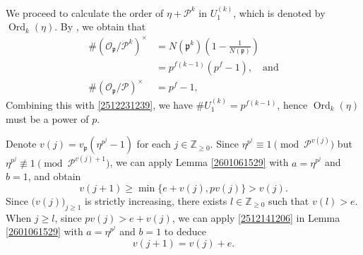 \documentclass[12pt]{amsart}
\theoremstyle{plain}
\theoremstyle{definition}
\theoremstyle{remark}
\numberwithin{equation}{section}
\newcommand{\Z}{\mathbb Z}
\begin{document}
	We proceed to calculate the order of \(\eta + \mathcal{ P}^k\) in $U_1^{(k)}$, which is denoted by \(\operatorname{Ord}_k(\eta)\). By \cite[Theorem 80]{Hecke}, we obtain that  
	\[
	\begin{split}
		\#(\mathcal{O}_\mathfrak{p} / \mathcal{P}^k)^{\times}&= N(\mathfrak p^k)\left(1 - \frac{1}{N( \mathfrak{p})}\right)\\
		&= p^{f(k-1)}(p^f - 1),\quad \text{and}\\
		\#(\mathcal{O}_\mathfrak{p} / \mathcal{P})^{\times} &= p^f - 1,
	\end{split}
	\] 
	Combining this with \eqref{2512231239}, we have $\#U_1^{(k)} = p^{f(k-1)}$, hence \(\operatorname{Ord}_k(\eta)\) must be a power of \(p\). 
	
	Denote $v(j)=v_\mathfrak{p}(\eta^{p^j}-1)$ for each  $j\in\Z_{\ge0}$. Since $\eta^{p^{j}}\equiv 1\!\!\pmod{\mathcal{P}^{v(j)}}$ but $\eta^{p^{j}}\not\equiv 1\!\!\pmod{\mathcal{P}^{v(j)+1}}$, we can apply Lemma \ref{2601061529} with $a=\eta^{p^{j}}$ and $b=1$, and obtain
	\[
	v(j+1) \geq \min\{e + v(j), p v(j)\} > v(j).
	\]  
	Since \(\big(v(j)\big)_{j \geq 1}\) is strictly increasing, there exists \(l \in \Z_{\ge0}\) such that \(v(l) > e\).  
	When \(j \geq l\), since $pv(j)>e+v(j)$, we can apply \eqref{2512141206} in Lemma \ref{2601061529} with $a=\eta^{p^{j}}$ and $b=1$ to deduce
	\begin{equation}\label{2512251005}
		v(j+1)= v(j) + e.
	\end{equation}
	
\end{document}

